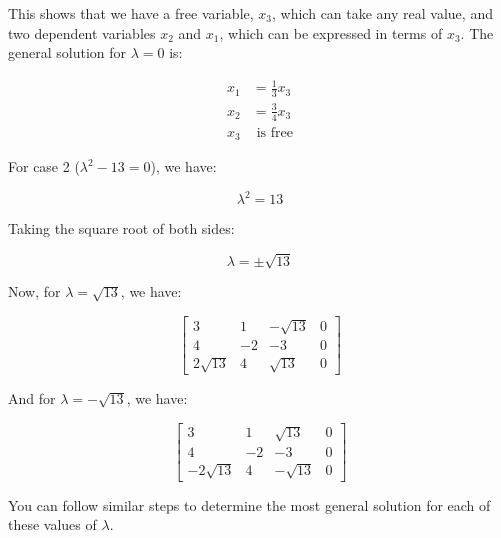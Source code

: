 This shows that we have a free variable, $x_3$, which can take any real value, and two dependent variables $x_2$ and $x_1$, which can be expressed in terms of $x_3$. The general solution for $\lambda = 0$ is:


\begin{align*}
x_1 &= \frac{1}{3}x_3 \\
x_2 &= \frac{3}{4}x_3 \\
x_3 &\text{ is free}
\end{align*}


For case 2 ($\lambda^2 - 13 = 0$), we have:

\[
\lambda^2 = 13
\]

Taking the square root of both sides:

\[
\lambda = \pm \sqrt{13}
\]

Now, for $\lambda = \sqrt{13}$, we have:

\[
\begin{bmatrix}
3 & 1 & -\sqrt{13} & 0 \\
4 & -2 & -3 & 0 \\
2\sqrt{13} & 4 & \sqrt{13} & 0
\end{bmatrix}
\]

And for $\lambda = -\sqrt{13}$, we have:

\[
\begin{bmatrix}
3 & 1 & \sqrt{13} & 0 \\
4 & -2 & -3 & 0 \\
-2\sqrt{13} & 4 & -\sqrt{13} & 0
\end{bmatrix}
\]

You can follow similar steps to determine the most general solution for each of these values of $\lambda$.
